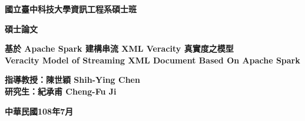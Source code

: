 \documentclass[12pt, a4paper]{article}
\begin{document}
\begin{center}
\thispagestyle{empty}
{\fontsize{22}{27} \textbf{國立臺中科技大學資訊工程系碩士班}}\\\par
\vspace{20pt}

{\fontsize{22}{27} \textbf{碩士論文}}


\vspace{3cm}

{\fontsize{24}{29} \textbf{基於 Apache Spark 建構串流 XML Veracity 真實度之模型}}\\
\vspace{29pt}
{\fontsize{20}{24} \textbf{Veracity Model of Streaming XML Document Based On Apache Spark}}\\
\vspace{156pt}


{\fontsize{16}{20} 
\textbf{指導教授：陳世穎 Shih-Ying Chen}\\
\vspace{20pt}
\hspace{12pt}\textbf{研究生：紀承甫 Cheng-Fu Ji}
}

\vspace{112pt}

{\fontsize{22}{27} \textbf{中華民國108年7月}}
\newpage
\thispagestyle{empty}



\end{center}
\end{document}

